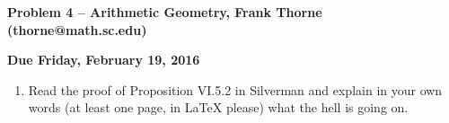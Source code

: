 \documentclass[12pt]{article}
\begin{document}
\newcommand\Hom{\operatorname{Hom}}
\newcommand\Aut{\operatorname{Aut}}
\newcommand\Out{\operatorname{Out}}
\newcommand\Vol{\operatorname{Vol}}
\newcommand\C{\mathbb{C}}
\newcommand\Disc{\operatorname{Disc}}
\newcommand\disc{\operatorname{Disc}}
\newcommand\im{\operatorname{im}}
\newcommand\ord{\operatorname{ord}}

\setlength{\topmargin}{-2mm}





\begin{center}{\bf Problem 4 -- Arithmetic Geometry, Frank Thorne (thorne@math.sc.edu)}
\end{center}
\begin{center}
{\bf Due Friday, February 19, 2016}
\end{center}

\begin{enumerate}[(1)]
\item
Read the proof of Proposition VI.5.2 in Silverman and explain in your own words (at least one page, in LaTeX please)
what the hell is going on.
\end{enumerate}
\end{document}

